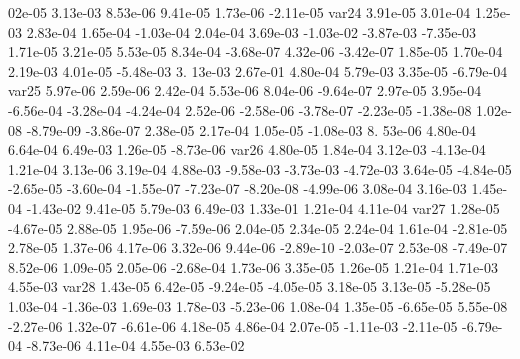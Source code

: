 02e-05  3.13e-03  8.53e-06  9.41e-05  1.73e-06 -2.11e-05
var24  3.91e-05  3.01e-04  1.25e-03  2.83e-04  1.65e-04 -1.03e-04  2.04e-04  3.69e-03 -1.03e-02 -3.87e-03 -7.35e-03  1.71e-05  3.21e-05  5.53e-05  8.34e-04 -3.68e-07  4.32e-06 -3.42e-07  1.85e-05  1.70e-04  2.19e-03  4.01e-05 -5.48e-03  3.
13e-03  2.67e-01  4.80e-04  5.79e-03  3.35e-05 -6.79e-04
var25  5.97e-06  2.59e-06  2.42e-04  5.53e-06  8.04e-06 -9.64e-07  2.97e-05  3.95e-04 -6.56e-04 -3.28e-04 -4.24e-04  2.52e-06 -2.58e-06 -3.78e-07 -2.23e-05 -1.38e-08  1.02e-08 -8.79e-09 -3.86e-07  2.38e-05  2.17e-04  1.05e-05 -1.08e-03  8.
53e-06  4.80e-04  6.64e-04  6.49e-03  1.26e-05 -8.73e-06
var26  4.80e-05  1.84e-04  3.12e-03 -4.13e-04  1.21e-04  3.13e-06  3.19e-04  4.88e-03 -9.58e-03 -3.73e-03 -4.72e-03  3.64e-05 -4.84e-05 -2.65e-05 -3.60e-04 -1.55e-07 -7.23e-07 -8.20e-08 -4.99e-06  3.08e-04  3.16e-03  1.45e-04 -1.43e-02  9.41e-05  5.79e-03  6.49e-03  1.33e-01  1.21e-04  4.11e-04
var27  1.28e-05 -4.67e-05  2.88e-05  1.95e-06 -7.59e-06  2.04e-05  2.34e-05  2.24e-04  1.61e-04 -2.81e-05  2.78e-05  1.37e-06  4.17e-06  3.32e-06  9.44e-06 -2.89e-10 -2.03e-07  2.53e-08 -7.49e-07  8.52e-06  1.09e-05  2.05e-06 -2.68e-04  1.73e-06  3.35e-05  1.26e-05  1.21e-04  1.71e-03  4.55e-03
var28  1.43e-05  6.42e-05 -9.24e-05 -4.05e-05  3.18e-05  3.13e-05 -5.28e-05  1.03e-04 -1.36e-03  1.69e-03  1.78e-03 -5.23e-06  1.08e-04  1.35e-05 -6.65e-05  5.55e-08 -2.27e-06  1.32e-07 -6.61e-06  4.18e-05  4.86e-04  2.07e-05 -1.11e-03 -2.11e-05 -6.79e-04 -8.73e-06  4.11e-04  4.55e-03  6.53e-02



